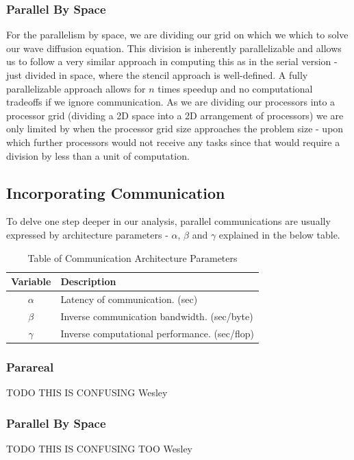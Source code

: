 \documentclass[letterpaper,12pt]{article}
\begin{document}
\subsubsection{Parallel By Space}

For the parallelism by space, we are dividing our grid on which we which to solve our wave diffusion equation. This division is inherently parallelizable and allows us to follow a very similar approach in computing this as in the serial version - just divided in space, where the stencil approach is well-defined. A fully parallelizable approach allows for $n$ times speedup and no computational tradeoffs if we ignore communication. As we are dividing our processors into a processor grid (dividing a 2D space into a 2D arrangement of processors) we are only limited by when the processor grid size approaches the problem size - upon which further processors would not receive any tasks since that would require a division by less than a unit of computation.

\subsection{Incorporating Communication}

To delve one step deeper in our analysis, parallel communications are usually expressed by architecture parameters - $\alpha$, $\beta$ and $\gamma$ explained in the below table.

\begin{table}
\centering
\begin{tabular}{|c|l|}
{\bf Variable} & {\bf Description}\\
\hline\hline
$\alpha$ & Latency of communication. (sec)\\
$\beta$ & Inverse communication bandwidth. (sec/byte)\\
$\gamma$ & Inverse computational performance. (sec/flop)\\
\hline
\end{tabular}
\caption{Table of Communication Architecture Parameters}
\label{tab:notation}
\end{table}

\subsubsection{Parareal}
TODO THIS IS CONFUSING Wesley


\subsubsection{Parallel By Space}
TODO THIS IS CONFUSING TOO Wesley
\end{document}
